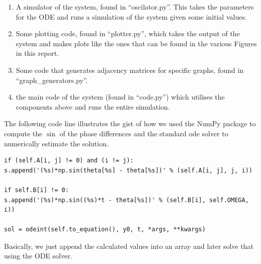 \begin{enumerate}
	\item A simulator of the system, found in ``oscilator.py''. This takes the parameters for the ODE and runs a simulation of the system given some initial values. 
	\item Some plotting code, found in ``plotter.py'', which takes the output of the system and makes plots like the ones that can be found in the various Figures in this report. 
	\item Some code that generates adjacency matrices for specific graphs, found in ``graph\_generators.py''. 
	\item the main code of the system (found in ``code.py'') which utilises the components above and runs the entire simulation. 
\end{enumerate}

The following code line illustrates the gist of how we used the NumPy package to compute the $\sin$ of the phase differences and the standard ode solver to numerically estimate the solution.
\begin{lstlisting}
if (self.A[i, j] != 0) and (i != j):
s.append('(%s)*np.sin(theta[%s] - theta[%s])' % (self.A[i, j], j, i))

if self.B[i] != 0:
s.append('(%s)*np.sin((%s)*t - theta[%s])' % (self.B[i], self.OMEGA, i))

sol = odeint(self.to_equation(), y0, t, *args, **kwargs)
\end{lstlisting}
Basically, we just append the calculated values into an array and later solve that using the ODE solver. 